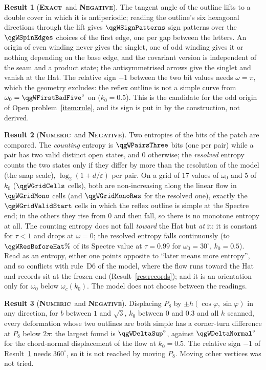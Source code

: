 \documentclass[11pt]{article}
\newcommand{\exact}{\textbf{\textsc{Exact}}}
\newcommand{\numeric}{\textbf{\textsc{Numeric}}}
\newcommand{\negres}{\textbf{\textsc{Negative}}}
\theoremstyle{definition}
\newtheorem{result}{Result}
\begin{document}
\begin{result}[\exact\ and \negres]\label{res:flow-spin}
The tangent angle of the outline lifts to a double cover in which it is antiperiodic; reading the outline's six hexagonal directions through the lift gives $\qgWSignPatterns$ sign patterns over the $\qgWSpinEdges$ choices of the first edge, one per gap between the letters. An origin of even winding never gives the singlet, one of odd winding gives it or nothing depending on the base edge, and the covariant version is independent of the seam and a product state; the antisymmetrised arrows give the singlet and vanish at the Hat. The relative sign $-1$ between the two bit values needs $\omega=\pi$, which the geometry excludes: the reflex outline is not a simple curve from $\omega_0=\qgWFirstBadFive^\circ$ on ($k_0=0.5$). This is the candidate for the odd origin of Open problem~\ref{item:rule}, and its sign is put in by the construction, not derived.
\end{result}
\begin{result}[\numeric\ and \negres]\label{res:flow-entropy}
Two entropies of the bits of the patch are compared. The \emph{counting} entropy is $\qgWPairsThree$ bits (one per pair) while a pair has two valid distinct open states, and $0$ otherwise; the \emph{resolved} entropy counts the two states only if they differ by more than the resolution of the model (the snap scale), $\log_2(1+d/\varepsilon)$ per pair. On a grid of $17$ values of $\omega_0$ and $5$ of $k_0$ ($\qgWGridCells$ cells), both are non-increasing along the linear flow in $\qgWGridMono$ cells (and $\qgWGridMonoRes$ for the resolved one), exactly the $\qgWGridValidStart$ cells in which the reflex outline is simple at the Spectre end; in the others they rise from $0$ and then fall, so there is no monotone entropy at all. The counting entropy does not fall \emph{toward} the Hat but \emph{at} it: it is constant for $\tau<1$ and drops at $\omega=0$; the resolved entropy falls continuously (to $\qgWResBeforeHat\%$ of its Spectre value at $\tau=0.99$ for $\omega_0=30^\circ$, $k_0=0.5$). Read as an entropy, either one points opposite to ``later means more entropy'', and so conflicts with rule~D6 of the model, where the flow runs toward the Hat and records sit at the frozen end (Result~\ref{res:records}); and it is an orientation only for $\omega_0$ below $\omega_c(k_0)$. The model does not choose between the readings.
\end{result}
\begin{result}[\numeric\ and \negres]\label{res:flow-sign}
Displacing $P_8$ by $\pm h(\cos\varphi,\sin\varphi)$ in any direction, for $b$ between $1$ and $\sqrt3$, $k_0$ between $0$ and $0.3$ and all $h$ scanned, every deformation whose two outlines are both simple has a corner-turn difference at $P_8$ below $2\pi$: the largest found is $\qgWDeltaSup^\circ$, against $\qgWDeltaNormal^\circ$ for the chord-normal displacement of the flow at $k_0=0.5$. The relative sign $-1$ of Result~\ref{res:flow-spin} needs $360^\circ$, so it is not reached by moving $P_8$. Moving other vertices was not tried.
\end{result}
\end{document}
